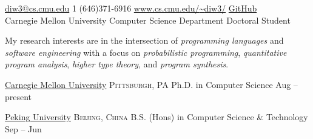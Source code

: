 \documentclass[10pt,a4paper]{article}
\begin{document}
\sloppy  %



\nobreakvspace{0.3em}  %

\noindent\href{mailto:diw3@cs.cmu.edu}{diw3\mbox{}@\mbox{}cs.cmu.edu}\sbull
\textsmaller{+}1 (646)371-6916\sbull
\href{https://www.cs.cmu.edu/~diw3/}{www.cs.cmu.edu/{\textasciitilde}diw3/}\sbull
\href{https://github.com/stonebuddha}{GitHub}
\\
Carnegie Mellon University\sbull
Computer Science Department\sbull
Doctoral Student

\spacedhrule{0.9em}{-0.4em}  %


My research interests are in the intersection of \emph{programming languages} and \emph{software engineering} with a focus on \emph{probabilistic programming}, \emph{quantitative program analysis}, \emph{higher type theory}, and \emph{program synthesis}.

\spacedhrule{0.9em}{-0.4em}


\headedsection
{\href{https://www.cmu.edu/}{Carnegie Mellon University}}
{\textsc{Pittsburgh, PA}}
{
\headedsubsection
{Ph.D. in Computer Science}
{Aug  -- present}
{
}
}

\headedsection
{\href{http://english.pku.edu.cn/}{Peking University}}
{\textsc{Beijing, China}}
{
\headedsubsection
{B.S. (Hons) in Computer Science \& Technology}
{Sep  -- Jun }
{
}
}
\end{document}
